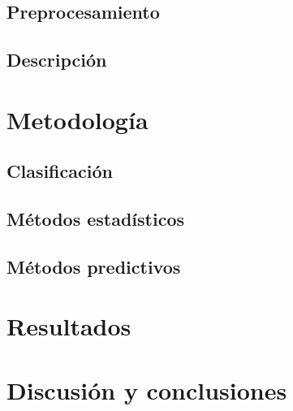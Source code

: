 \documentclass[colorinlistoftodos]{article}
\begin{document}
\subsection{Preprocesamiento}

\subsection{Descripción}

\section{Metodología}
\subsection{Clasificación}
\subsection{Métodos estadísticos}
\subsection{Métodos predictivos}




\section{Resultados}

\section{Discusión y conclusiones}




\listoftodos%
\end{document}
